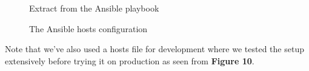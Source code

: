 \begin{figure}[H]
    \centering
    \caption{Extract from the Ansible playbook}
    \label{fig:extract-from-ansible-playbook}
\end{figure}

\begin{figure}[H]
    \centering
    \caption{The Ansible hosts configuration}
    \label{fig:image-of-ansible-hosts}
\end{figure}
Note that we've also used a hosts file for development where we tested the setup extensively before trying it on production as seen from \textbf {Figure 10}.

